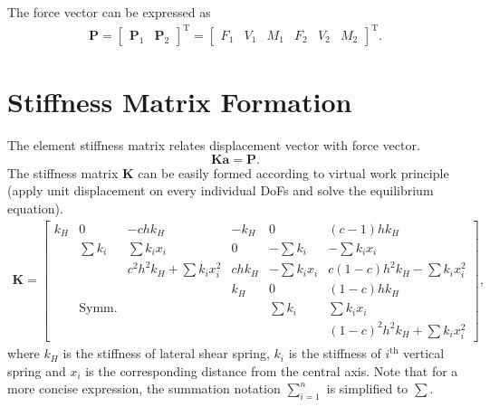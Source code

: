 \documentclass[11pt]{article}
\newcommand*{\mT}{\mathrm{T}}
\begin{document}
The force vector can be expressed as
\begin{gather}
\mathbf{P}=\begin{bmatrix}
	\mathbf{P}_1 & \mathbf{P}_2
\end{bmatrix}^\mT=
\begin{bmatrix}
	F_1 & V_1 & M_1 & F_2 & V_2 & M_2
\end{bmatrix}^\mT.
\end{gather}
\section{Stiffness Matrix Formation}
The element stiffness matrix relates displacement vector with force vector.
\begin{equation}\label{A21}
\mathbf{K}\mathbf{a}=\mathbf{P}.
\end{equation}
The stiffness matrix $\mathbf{K}$ can be easily formed according to virtual work principle (apply unit displacement on every individual DoFs and solve the equilibrium equation).
\begin{gather}
\mathbf{K}=\begin{bmatrix}
	k_H &      0       &          -chk_H          & -k_H  &       0       &          (c-1)hk_H           \\
	    &  \sum{}k_i   &       \sum{}k_ix_i       &   0   &  -\sum{}k_i   &        -\sum{}k_ix_i         \\
	    &              & c^2h^2k_H+\sum{}k_ix_i^2 & chk_H & -\sum{}k_ix_i & c(1-c)h^2k_H-\sum{}k_ix_i^2  \\
	    &              &                          &  k_H  &       0       &          (1-c)hk_H           \\
	    & \text{Symm.} &                          &       &   \sum{}k_i   &         \sum{}k_ix_i         \\
	    &              &                          &       &               & (1-c)^2h^2k_H+\sum{}k_ix_i^2
\end{bmatrix},\label{MVLEMK}
\end{gather}
where $k_H$ is the stiffness of lateral shear spring, $k_i$ is the stiffness of $i^{\mathrm{th}}$ vertical spring and $x_i$ is the corresponding distance from the central axis. Note that for a more concise expression, the summation notation $\sum\limits_{i=1}^{n}$ is simplified to $\sum$.
\end{document}
